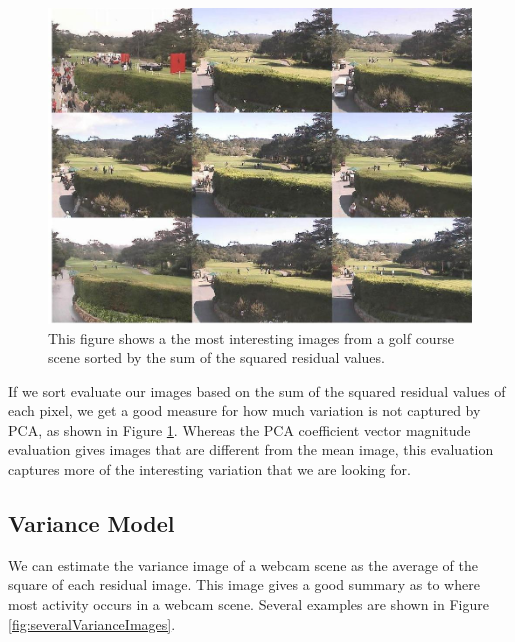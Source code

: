 \begin{figure}
	\centering
		\includegraphics[width=1\textwidth]{figures/residualSSDmontage.jpg}
	
	
		\caption[Sum Squared Residual Montage.]{This figure shows a the most interesting images from a golf course scene sorted by the sum of the squared residual values.}
		\label{fig:residualSSDmontage}
\end{figure}

If we sort evaluate our images based on the sum of the squared residual values of each pixel, we get a good measure for how much variation is not captured by PCA, as shown in Figure \ref{fig:residualSSDmontage}.  Whereas the PCA coefficient vector magnitude evaluation gives images that are different from the mean image, this evaluation captures more of the interesting variation that we are looking for.


\subsection{Variance Model}

We can estimate the variance image of a webcam scene as the average of the square of each residual image.  This image gives a good summary as to where most activity occurs in a webcam scene.  Several examples are shown in Figure \ref{fig:severalVarianceImages}.

